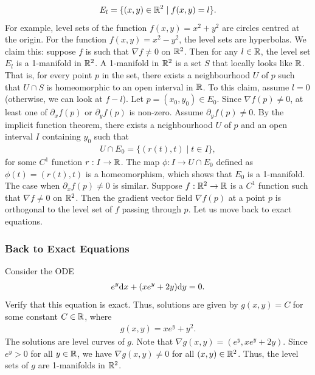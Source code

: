 \begin{align}
    E_{l} = \{(x,y) \in \mathbb{R}^{2} \mid f(x,y) = l\}.
\end{align}
For example, level sets of the function $f(x,y) = x^{2} + y^{2}$ are circles centred at the origin. For the function $f(x,y) = x^{2} - y^{2}$, the level sets are hyperbolas. We claim this: suppose $f$ is such that $\nabla f \neq 0$ on $\mathbb{R}^{2}$. Then for any $l \in \mathbb{R}$, the level set $E_{l}$ is a 1-manifold in $\mathbb{R}^{2}$. A 1-manifold in $\mathbb{R}^{2}$ is a set $S$ that locally looks like $\mathbb{R}$. That is, for every point $p$ in the set, there exists a neighbourhood $U$ of $p$ such that $U \cap S$ is homeomorphic to an open interval in $\mathbb{R}$. To this claim, assume $l = 0$ (otherwise, we can look at $f - l$). Let $p = (x_{0},y_{0}) \in E_{0}$. Since $\nabla f(p) \neq 0$, at least one of $\partial_{x} f(p)$ or $\partial_{y} f(p)$ is non-zero. Assume $\partial_{y} f(p) \neq 0$. By the implicit function theorem, there exists a neighbourhood $U$ of $p$ and an open interval $I$ containing $y_{0}$ such that
\begin{align}
    U \cap E_{0} = \{(r(t), t) \mid t \in I\},
\end{align}
for some $C^{1}$ function $r:I \to \mathbb{R}$. The map $\phi: I \to U \cap E_{0}$ defined as $\phi(t) = (r(t), t)$ is a homeomorphism, which shows that $E_{0}$ is a 1-manifold. The case when $\partial_{x} f(p) \neq 0$ is similar. Suppose $f:\mathbb{R}^{2} \to \mathbb{R}$ is a $C^{1}$ function such that $\nabla f \neq 0$ on $\mathbb{R}^{2}$. Then the gradient vector field $\nabla f(p)$ at a point $p$ is orthogonal to the level set of $f$ passing through $p$. Let us move back to exact equations.

\subsubsection{Back to Exact Equations}

\begin{example}
    Consider the ODE
    \begin{align}
        e^{y} \mathrm{d}x + (x e^{y} + 2y) \mathrm{d}y = 0.
    \end{align}
    Verify that this equation is exact. Thus, solutions are given by $g(x,y) = C$ for some constant $C \in \mathbb{R}$, where
    \begin{align}
        g(x,y) = x e^{y} + y^{2}.
    \end{align}
    The solutions are level curves of $g$. Note that $\nabla g(x,y) = (e^{y}, x e^{y} + 2y)$. Since $e^{y} > 0$ for all $y \in \mathbb{R}$, we have $\nabla g(x,y) \neq 0$ for all $(x,y) \in \mathbb{R}^{2}$. Thus, the level sets of $g$ are 1-manifolds in $\mathbb{R}^{2}$.
\end{example}

